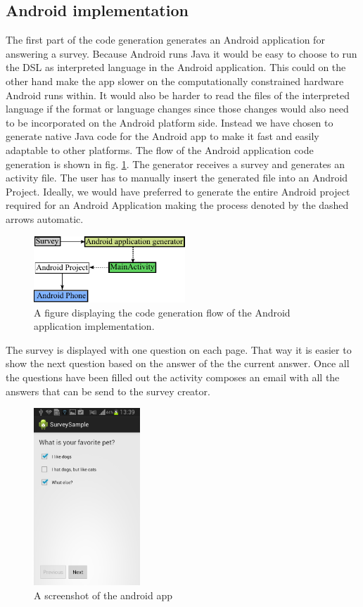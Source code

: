 \documentclass[runningheads]{llncs}
\begin{document}
\subsection{Android implementation}
The first part of the code generation generates an Android application for answering a survey. Because Android runs Java it would be easy to choose to run the DSL as interpreted language in the Android application. This could on the other hand make the app slower on the computationally constrained hardware Android runs within. It would also be harder to read the files of the interpreted language if the format or language changes since those changes would also need to be incorporated on the Android platform side. Instead we have chosen to generate native Java code for the Android app to make it fast and easily adaptable to other platforms. The flow of the Android application code generation is shown in fig. \ref{fig:appgen}. The generator receives a survey and generates an activity file. The user has to manually insert the generated file into an Android Project. Ideally, we would have preferred to generate the entire Android project required for an Android Application making the process denoted by the dashed arrows automatic. 
\begin{figure}
\centering
\includegraphics[height=2.5cm]{appgen}
\caption{A figure displaying the code generation flow of the Android application implementation.}
\label{fig:appgen}
\end{figure}
The survey is displayed with one question on each page. That way it is easier to show the next question based on the answer of the the current answer. Once all the questions have been filled out the activity composes an email with all the answers that can be send to the survey creator.

\begin{figure}[h]
\centering
\includegraphics[width=4cm]{android_screenshot}
\caption{A screenshot of the android app}
\label{fig:android_screenshot}
\end{figure}
\end{document}
